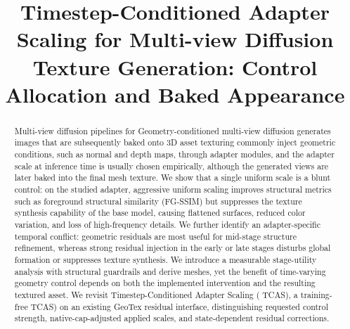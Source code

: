 \documentclass[times,twocolumn,final]{elsarticle}
\providecommand{\DIFadd}[1]{{\protect\color{blue} \sf #1}} %
\providecommand{\DIFdel}[1]{{\protect\color{red} \scriptsize #1}} %
\providecommand{\DIFaddbegin}{} %
\providecommand{\DIFaddend}{} %
\providecommand{\DIFdelbegin}{} %
\providecommand{\DIFdelend}{} %
\begin{document}
\begin{frontmatter}

\DIFdelbegin %
\DIFdelend \DIFaddbegin \title{Timestep-Conditioned Adapter Scaling for Multi-view Diffusion Texture Generation: Control Allocation and Baked Appearance}
\DIFaddend


\begin{abstract}
\DIFdelbegin \DIFdel{Multi-view diffusion pipelines for }\DIFdelend \DIFaddbegin \DIFadd{Geometry-conditioned multi-view diffusion generates images that are subsequently baked onto }\DIFaddend 3D \DIFdelbegin \DIFdel{asset texturing commonly inject geometric conditions, such as normal and depth maps, through adapter modules, and the adapter scale at inference time is usually chosen empirically, although the generated views are later baked into the final mesh texture. We show that a single uniform scale is a blunt control: on the studied adapter, aggressive uniform scaling improves structural metrics such as foreground structural similarity (FG-SSIM) but suppresses the texture synthesis capability of the base model, causing flattened surfaces, reduced color variation, and loss of high-frequency details.
We further identify an adapter-specific temporal conflict: geometric residuals are most useful for mid-stage structure refinement, whereas strong residual injection in the early or late stages disturbs global formation or suppresses texture synthesis. We introduce a measurable stage-utility analysis with structural guardrails and derive }\DIFdelend \DIFaddbegin \DIFadd{meshes, yet the benefit of time-varying geometry control depends on both the implemented intervention and the resulting textured asset. We revisit }\DIFaddend Timestep-Conditioned Adapter Scaling (\DIFdelbegin \DIFdel{TCAS), a training-free }\DIFdelend \DIFaddbegin \DIFadd{TCAS) on an existing GeoTex residual interface, distinguishing requested control strength, native-cap-adjusted applied scales, and state-dependent residual corrections.
}


\end{abstract}
\end{frontmatter}
\end{document}
